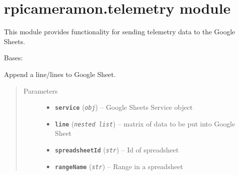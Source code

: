 \documentclass[letterpaper,10pt,english]{sphinxmanual}
\begin{document}
\chapter{rpicameramon.telemetry module}
\label{rpicameramon:rpicameramon-telemetry-module}
This module provides functionality for sending telemetry data to the Google Sheets.
\label{rpicameramon:module-rpicameramon.telemetry}

\begin{fulllineitems}
\label{rpicameramon:rpicameramon.telemetry.GoogleHandler}
Bases: 

\begin{fulllineitems}
\label{rpicameramon:rpicameramon.telemetry.GoogleHandler.add_sheet_line}
Append a line/lines to Google Sheet.
\begin{quote}\begin{description}
\item[{Parameters}] \leavevmode\begin{itemize}
\item {} 
\textbf{\texttt{service}} (\emph{\texttt{obj}}) -- Google Sheets Service object

\item {} 
\textbf{\texttt{line}} (\emph{\texttt{nested list}}) -- matrix of data to be put into Google Sheet

\item {} 
\textbf{\texttt{spreadsheetId}} (\emph{\texttt{str}}) -- Id of spreadsheet

\item {} 
\textbf{\texttt{rangeName}} (\emph{\texttt{str}}) -- Range in a spreadsheet

\end{itemize}

\end{description}\end{quote}

\end{fulllineitems}



\end{fulllineitems}
\end{document}
